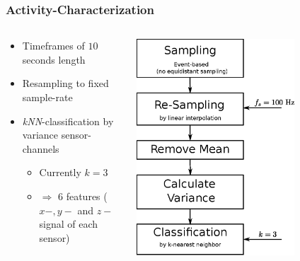 \documentclass[aspectratio=169]{beamer}
\begin{document}
\begin{frame}
	\frametitle{Activity-Characterization}
	\begin{columns}[onlytextwidth]
		\begin{column}{0.6\textwidth}
			\begin{itemize}
				\item Timeframes of $10$ seconds length
				\item Resampling to fixed sample-rate
				\item \textit{kNN}-classification by variance sensor-channels
				\begin{itemize}
					\item Currently $k=3$
					\item $\Rightarrow$ $6$ features ($x-, y-$ and $z-$ signal of each sensor)
				\end{itemize}
			\end{itemize}
		\end{column}
		\begin{column}{0.4\textwidth}
			\begin{center}
				\centering
				\includegraphics[width=0.7\textwidth]{signal_processing}
			\end{center}
		\end{column}
	\end{columns}
\end{frame}
\end{document}
